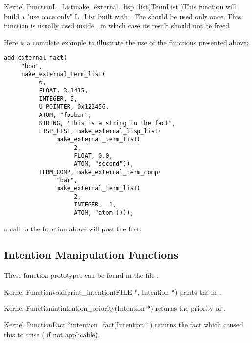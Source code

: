 \begin{typefn}{Kernel Function}{L\_List}{make\_external\_lisp\_list}{(TermList
)}This function will build a "use once only" L\_List built with
. The  should be used only once. This function
is usually used inside , in which case its
result should not be freed.
\end{typefn}

Here is a complete example to illustrate the use of the functions presented
above: 
\begin{verbatim}
add_external_fact(
     "boo", 
     make_external_term_list(
          6, 
          FLOAT, 3.1415, 
          INTEGER, 5,
          U_POINTER, 0x123456,
          ATOM, "foobar",
          STRING, "This is a string in the fact",
          LISP_LIST, make_external_lisp_list(
               make_external_term_list(
                    2, 
                    FLOAT, 0.0, 
                    ATOM, "second")),
          TERM_COMP, make_external_term_comp(
               "bar",
               make_external_term_list(
                    2,
                    INTEGER, -1,
                    ATOM, "atom"))));
\end{verbatim}

a call to the function above will post the fact:\*


\subsection{Intention Manipulation Functions}

These function prototypes can be found in the file
.

\begin{typefn}{Kernel Function}{void}{fprint\_intention}{(FILE *,
Intention *)}
prints the  in .
\end{typefn}

\begin{typefn}{Kernel Function}{int}{intention\_priority}{(Intention
*)}
returns the priority of .
\end{typefn}

\begin{typefn}{Kernel Function}{Fact *}{intention\_fact}{(Intention
*)}
returns the fact which caused this  to arise
( if not applicable).
\end{typefn}

